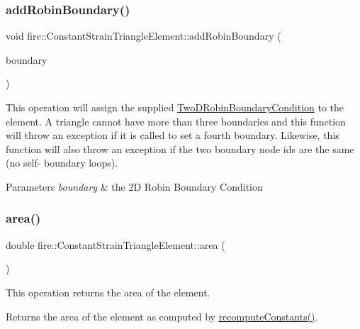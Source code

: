 \subsubsection{\texorpdfstring{add\+Robin\+Boundary()}{addRobinBoundary()}}
{\footnotesize\ttfamily void fire\+::\+Constant\+Strain\+Triangle\+Element\+::add\+Robin\+Boundary (\begin{DoxyParamCaption}\item[{const \hyperlink{a00786}{Two\+D\+Robin\+Boundary\+Condition} \&}]{boundary }\end{DoxyParamCaption})}

This operation will assign the supplied \hyperlink{a00786}{Two\+D\+Robin\+Boundary\+Condition} to the element. A triangle cannot have more than three boundaries and this function will throw an exception if it is called to set a fourth boundary. Likewise, this function will also throw an exception if the two boundary node ids are the same (no self-\/ boundary loops). 
\begin{DoxyParams}{Parameters}
{\em boundary} & the 2D Robin Boundary Condition \\
\hline
\end{DoxyParams}
\mbox{\label{a00770_acd197716c6bffaa3c7b472661f0e5ca4}} 
\subsubsection{\texorpdfstring{area()}{area()}}
{\footnotesize\ttfamily double fire\+::\+Constant\+Strain\+Triangle\+Element\+::area (\begin{DoxyParamCaption}{ }\end{DoxyParamCaption})}

This operation returns the area of the element. \begin{DoxyReturn}{Returns}
the area of the element as computed by \hyperlink{a00770_a40cf9432221b62db76e8b154e3e81e3d}{recompute\+Constants()}. 
\end{DoxyReturn}
\mbox{\label{a00770_ae0795172aa1ee5ffc68ec0e2c4aab9cc}} 
